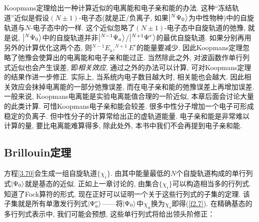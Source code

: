 Koopmans定理给出一种计算近似的电离能和电子亲和能的办法. 这种“冻结轨道”近似是假设$(N\pm1)$-电子态(就是正/负离子, 如果$\Ket{^N\Psi_0}$为中性物种)中的自旋轨道与$N$-电子态中的一样. 
这个近似忽略了$(N\pm1)$-电子态中自旋轨道的弛豫, 就是说, $\Ket{^N\Psi_0}$中的自旋轨道并非$\Ket{^{N-1}\Psi_a}$/$\Ket{^{N+1}\Psi^r}$的最优自旋轨道. 
如果分别再用另外的\hft 计算优化这两个态, 则$^{N-1}E_a,^{N+1}E^r$的能量要减少. 因此Koopmans定理忽略了弛豫会使算出的电离能和电子亲和能过正. 
当然除此之外, 对波函数作单行列式近似也会产生误差, 即\emph{相关效应}, 通过\hft 之外的办法可以计算, 可对Koopmans定理的结果作进一步修正. 
实际上, 当系统内电子数目越大时, 相关能也会越大. 
因此相关效应会抹掉电离能的一部分弛豫误差, 而在电子亲和能的弛豫误差上再增加误差. 
一般来说, Koopmans电离能是实验电离能值合理的一阶近似, 本章后面会讨论大量的此类计算. 
可惜Koopmans电子亲和能会较差. 很多中性分子增加一个电子可形成稳定的负离子. 
但中性分子的\hft 计算常给出正的虚轨道能量. 
电子亲和能是非常难以计算的量, 要比电离能难算得多, 除此处外, 本书中我们不会再提到电子亲和能.

\subsection{Brillouin定理}
\label{sec3.3.2}
\hft 方程\eqref{3.70}会生成一组自旋轨道$\{\chi_i\}$. 
由其中能量最低的$N$个自旋轨道构成的单行列式$\Ket{\Psi_0}$就是基态的\hft 近似. 
正如上一章讨论的, 由集合$\{\chi_i\}$可以构造相当多的行列式. 
知道了Fock算符的形式, 现在正好可以证明一个关于这些行列式的子集的定理. 
该子集就是所有单激发行列式$\Ket{\Psi_a^r}$——将$\Ket{\Psi_0}$中$\chi_a$换为$\chi_r$即得(\ref{f2.7}). 
在精确基态的多行列式表示中, 我们可能会预想, 这些单行列式将给出领头阶修正：

